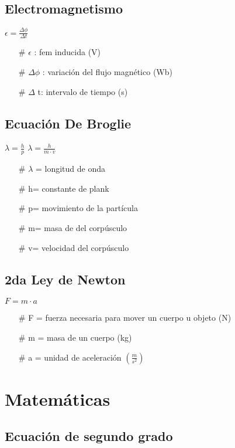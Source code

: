 \documentclass[a4peper, 12pt]{article}
\begin{document}
\subsection{Electromagnetismo}

$\epsilon= \frac{\Delta \phi}{\Delta t}$

\begin{itemize}
    \item[\#] $\epsilon$ : fem inducida (V)
    \item[\#] $\Delta \phi$ : variación del flujo magnético (Wb)
    \item[\#] $\Delta$ t: intervalo de tiempo (s)
\end{itemize}

\subsection{ Ecuación De Broglie}

$\lambda = \frac{h}{p}$ $\lambda = \frac{h}{m \cdot v}$
\begin{itemize}
    \item [\#] $\lambda$ = longitud de onda 
    \item[\#]  h= constante de plank
    \item [\#] p= movimiento de la partícula
    \item[\#]  m= masa de del corpúsculo
    \item[\#]  v= velocidad del corpúsculo
\end{itemize}

\subsection{ 2da Ley de Newton}

$F= m \cdot a$

\begin{itemize}
    \item[\#]  F = fuerza necesaria para mover un cuerpo u objeto (N)
    \item[\#]  m = masa de un cuerpo (kg)
    \item[\#]  a = unidad de aceleración  $(\frac{m}{s^2})$
\end{itemize}

\section{Matemáticas}

\subsection{Ecuación de segundo grado}
\end{document}
